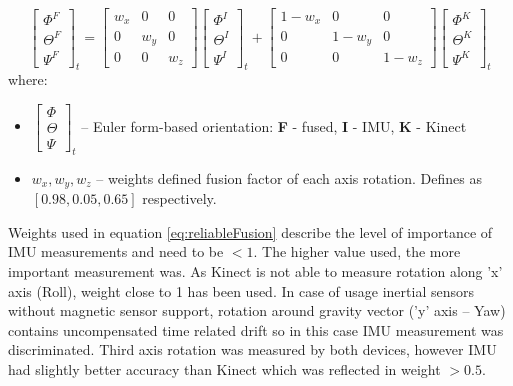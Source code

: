 \documentclass[9pt]{llncs}
\begin{document}
\begin{equation}
	\label{eq:reliableFusion}
	\begin{bmatrix}  \Phi^F \\  \Theta^F \\  \Psi^F \end{bmatrix}_t = 
	\begin{bmatrix}  w_x&0&0 \\  0&w_y&0 \\  0&0&w_z \end{bmatrix}
	\begin{bmatrix}  \Phi^I \\  \Theta^I \\  \Psi^I \end{bmatrix}_t + 
	\begin{bmatrix}  1-w_x&0&0 \\  0&1-w_y&0 \\  0&0&1-w_z \end{bmatrix}
	\begin{bmatrix}  \Phi^K \\  \Theta^K \\  \Psi^K \end{bmatrix}_t
\end{equation}
where:
\begin{itemize}
	\item $ \begin{bmatrix}  \Phi \\  \Theta \\  \Psi \end{bmatrix}_t$ -- Euler form-based orientation: \textbf{F} - fused, \textbf{I} - IMU, \textbf{K} - Kinect
	\item $w_x,w_y,w_z$ -- weights defined fusion factor of each axis rotation. Defines as $[0.98, 0.05, 0.65]$ respectively.
\end{itemize}

Weights used in equation \ref{eq:reliableFusion} describe the level of importance of IMU measurements and need to be $ < 1$. The higher value used, the more important measurement was. As Kinect is not able to measure rotation along 'x' axis (Roll), weight close to 1 has been used. In case of usage inertial sensors without magnetic sensor support, rotation around gravity vector ('y' axis -- Yaw) contains uncompensated time related drift so in this case IMU measurement was discriminated. Third axis rotation was measured by both devices, however IMU had slightly better accuracy than Kinect which was reflected in weight $ > 0.5$.
\end{document}
